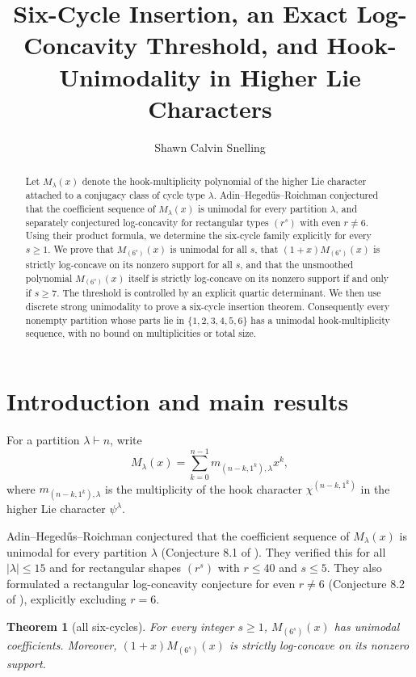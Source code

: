 \documentclass[11pt]{amsart}
\title{Six-Cycle Insertion, an Exact Log-Concavity Threshold, and Hook-Unimodality in Higher Lie Characters}
\author{Shawn Calvin Snelling}
\newtheorem{theorem}{Theorem}
\begin{document}
\begin{abstract}
Let \(M_\lambda(x)\) denote the hook-multiplicity polynomial of the higher Lie character attached to a conjugacy class of cycle type \(\lambda\). Adin--Heged\H{u}s--Roichman conjectured that the coefficient sequence of \(M_\lambda(x)\) is unimodal for every partition \(\lambda\), and separately conjectured log-concavity for rectangular types \((r^s)\) with even \(r\neq 6\). Using their product formula, we determine the six-cycle family explicitly for every \(s\ge1\). We prove that \(M_{(6^s)}(x)\) is unimodal for all \(s\), that \((1+x)M_{(6^s)}(x)\) is strictly log-concave on its nonzero support for all \(s\), and that the unsmoothed polynomial \(M_{(6^s)}(x)\) itself is strictly log-concave on its nonzero support if and only if \(s\ge7\). The threshold is controlled by an explicit quartic determinant. We then use discrete strong unimodality to prove a six-cycle insertion theorem. Consequently every nonempty partition whose parts lie in \(\{1,2,3,4,5,6\}\) has a unimodal hook-multiplicity sequence, with no bound on multiplicities or total size.
\end{abstract}
\maketitle

\section{Introduction and main results}
For a partition \(\lambda\vdash n\), write
\[
M_\lambda(x)=\sum_{k=0}^{n-1}m_{(n-k,1^k),\lambda}x^k,
\]
where \(m_{(n-k,1^k),\lambda}\) is the multiplicity of the hook character \(\chi^{(n-k,1^k)}\) in the higher Lie character \(\psi^\lambda\).

Adin--Heged\H{u}s--Roichman \cite{AHR} conjectured that the coefficient sequence of \(M_\lambda(x)\) is unimodal for every partition \(\lambda\) (Conjecture 8.1 of \cite{AHR}). They verified this for all \(|\lambda|\le15\) and for rectangular shapes \((r^s)\) with \(r\le40\) and \(s\le5\). They also formulated a rectangular log-concavity conjecture for even \(r\neq6\) (Conjecture 8.2 of \cite{AHR}), explicitly excluding \(r=6\).

\begin{theorem}[all six-cycles]\label{thm:all-six}
For every integer \(s\ge1\), \(M_{(6^s)}(x)\) has unimodal coefficients. Moreover, \((1+x)M_{(6^s)}(x)\) is strictly log-concave on its nonzero support.
\end{theorem}
\end{document}
